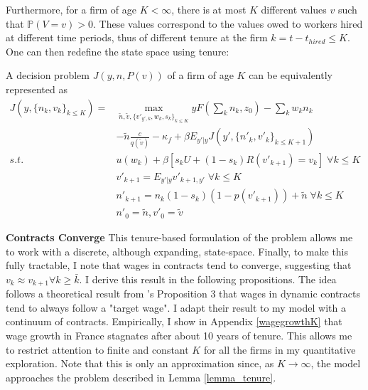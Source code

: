 Furthermore, for a firm of age $K<\infty$, there is at most $K$ different values $v$ such that $\mathbb{P}(V=v)>0$. These values correspond to the values owed to workers hired at different time periods, thus of different tenure at the firm $k=t-t_{hired}\leq K$.  One can then redefine the state space using tenure: 
\begin{lemma} \label{lemma_tenure}
A decision problem $J(y,n,P(v))$ of a firm of age $K$ can be equivalently represented as
\begin{equation*}
    \begin{split}
 J(y,\{n_k,v_k\}_{k\leq K}) =
    & \max_{\tilde{n},\tilde{v},\{v'_{y',k},w_{k},s_{k}\}_{k\leq K}} 
    yF(\sum_k n_k,z_0)-
    \sum_k w_kn_k \\
    & -\tilde{n}\frac{c}{q(\tilde{v})}-\kappa_f
    +\beta E_{y'|y} J(y',\{n'_k,v'_k\}_{k\leq K+1}) \\
     s.t. \: & u(w_k) + \beta [s_k U + (1-s_k)R(v'_{k+1})=v_k] \; \forall k\leq K \\
    & v'_{k+1} = E_{y'|y} v'_{k+1,y'} \; \forall k\leq K \\
    & n'_{k+1} = n_k(1-s_k)(1-p(v'_{k+1}))+\tilde{n}\; \forall k\leq K \\
    & n'_0 = \tilde{n}, v'_0 = \tilde{v}
    \end{split}
\end{equation*}
\end{lemma}
\textbf{Contracts Converge}
This tenure-based formulation of the problem allows me to work with a discrete, although expanding, state-space. Finally, to make this fully tractable, I note that wages in contracts tend to converge, suggesting that $v_k\approx v_{k+1} \forall k\geq\bar{k}$. I derive this result in the following propositions. The idea follows a theoretical result from \textcite{balke2022}'s Proposition 3 that wages in dynamic contracts tend to always follow a "target wage". I adapt their result to my model with a continuum of contracts.
Empirically, I show in Appendix \ref{wagegrowthK} that wage growth in France stagnates after about 10 years of tenure.  This allows me to restrict attention to finite and constant $K$ for all the firms in my quantitative exploration. Note that this is only an approximation since, as $K\rightarrow\infty$, the model approaches the problem described in Lemma \ref{lemma_tenure}. \newline
